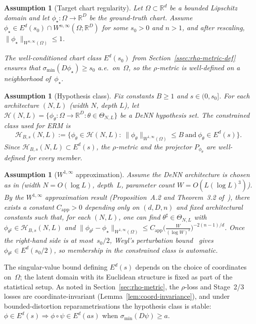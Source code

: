 \documentclass[11pt]{article}
\newcommand{\cH}{\mathcal{H}}
\newcommand{\Om}{\Omega}
\newcommand{\Rd}{\mathbb{R}^d}
\newcommand{\RD}{\mathbb{R}^D}
\newcommand{\norm}[1]{\lVert#1\rVert}
\newcommand{\sigmin}{\sigma_{\min}}
\newtheorem{assumption}[thm]{Assumption}
\begin{document}
\begin{assumption}[Target chart regularity]\label{ass:target-chart}
Let $\Om\subset\Rd$ be a bounded Lipschitz domain and let
$\phi_\star:\Om\to\RD$ be the ground-truth chart.  Assume
$\phi_\star\in E^d(s_0)\cap W^{n,\infty}(\Om;\RD)$ for some
$s_0>0$ and $n>1$, and after rescaling,
$ \norm{\phi_\star}_{W^{n,\infty}(\Om)}\le 1$.

The well-conditioned chart class $E^d(s_0)$ from
Section~\ref{ssec:rho-metric-def} ensures that
$\sigmin(D\phi_\star)\ge s_0$ a.e.\ on~$\Om$, so the $\rho$-metric
is well-defined on a neighborhood of~$\phi_\star$.
\end{assumption}

\begin{assumption}[Hypothesis class]\label{ass:rho-class}
Fix constants $B\ge 1$ and $s\in(0,s_0]$.  For each architecture
$(N,L)$ (width $N$, depth $L$), let
$\cH(N,L)=\{\phi_\theta:\Om\to\RD:\theta\in\Theta_{N,L}\}$ be a
DeNN hypothesis set.  The \emph{constrained} class used for
ERM is
\[
  \cH_{B,s}(N,L)
  :=\Big\{\phi_\theta\in\cH(N,L):\
    \norm{\phi_\theta}_{W^{1,\infty}(\Om)}\le B
    \ \text{and}\ \phi_\theta\in E^d(s)\Big\}.
\]
Since $\cH_{B,s}(N,L)\subset E^d(s)$, the $\rho$-metric and the
projector $P_{\phi_\theta}$ are well-defined for every member.
\end{assumption}

\begin{assumption}[$W^{1,\infty}$ approximation]\label{ass:W1infty-approx}
Assume the DeNN architecture is chosen as in
\cite{yang2025deeperwiderperspectiveoptimal}
(width $N=O(\log L)$, depth~$L$, parameter count
$W=O(L(\log L)^3)$).
By the $W^{1,\infty}$ approximation result
(Proposition~A.2 and Theorem~3.2
of~\cite{yang2025deeperwiderperspectiveoptimal}),
there exists a
constant $C_{\mathrm{app}}>0$ depending only on $(d,D,n)$ and fixed
architectural constants such that, for each $(N,L)$, one can find
$\theta^\sharp\in\Theta_{N,L}$ with
$\phi_{\theta^\sharp}\in\cH_{B,s}(N,L)$ and
$\norm{\phi_{\theta^\sharp}-\phi_\star}_{W^{1,\infty}(\Om)}
\le
C_{\mathrm{app}}
\bigl(\frac{W}{(\log W)^2}\bigr)^{-{2(n-1)}/{d}}$.
Once the right-hand side is at most~$s_0/2$, Weyl's perturbation
bound~\cite{horn2013matrix} gives
$\phi_{\theta^\sharp}\in E^d(s_0/2)$, so membership in the
constrained class is automatic.\label{rem:replace-Ed}
\end{assumption}


The singular-value bound defining $E^d(s)$ depends on the choice of
coordinates on~$\Om$; the latent domain with its Euclidean structure
is fixed as part of the statistical setup.
As noted in Section~\ref{sec:rho-metric}, the $\rho$-loss
and Stage~2/3 losses are
coordinate-invariant
(Lemma~\ref{lem:coord-invariance}), and under
bounded-distortion reparametrisations the hypothesis class is
stable: $\phi\in E^d(s)\Rightarrow\phi\circ\psi\in E^d(as)$ when
$\sigmin(D\psi)\ge a$.
\end{document}
